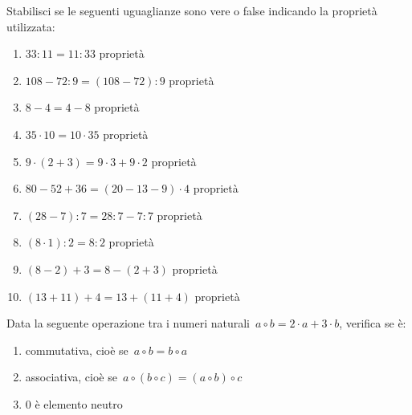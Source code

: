 
\begin{esercizio}
 Stabilisci se le seguenti uguaglianze sono vere o false indicando la 
proprietà utilizzata:
\TabPositions{5cm}
 \begin{enumerate}[noitemsep, label=(\alph*)]
 \item \(33:11=11:33\)	\tab proprietà\dotfill\enspace\boxV\qquad\boxF
 \item \(108-72:9=(108-72):9\)	\tab proprietà\dotfill\enspace\boxV\qquad\boxF
 \item \(8-4=4-8\)	\tab proprietà\dotfill\enspace\boxV\qquad\boxF
 \item \(35\cdot 10=10\cdot 35\)	\tab 
proprietà\dotfill\enspace\boxV\qquad\boxF
 \item \(9\cdot(2+3)=9\cdot3+9\cdot2\)	\tab 
proprietà\dotfill\enspace\boxV\qquad\boxF
 \item \(80-52+36=(20-13-9)\cdot 4\)	\tab 
proprietà\dotfill\enspace\boxV\qquad\boxF
 \item \((28-7):7=28:7-7:7\)	\tab proprietà\dotfill\enspace\boxV\qquad\boxF
 \item \((8\cdot 1):2=8:2\)	\tab proprietà\dotfill\enspace\boxV\qquad\boxF
 \item \((8-2)+3=8-(2+3)\)	\tab proprietà\dotfill\enspace\boxV\qquad\boxF
 \item \((13+11)+4=13+(11+4)\)	\tab proprietà\dotfill\enspace\boxV\qquad\boxF
 \end{enumerate}
\end{esercizio}

\begin{esercizio}
Data la seguente operazione tra i numeri naturali~\(a\circ b=2\cdot a +3\cdot 
b\), verifica se è:
 \begin{enumerate}[noitemsep, label=(\alph*)]
 \item commutativa, cioè se~\(a\circ b=b\circ a\)
 \item associativa, cioè se~\(a\circ (b\circ c)=(a\circ b)\circ c\)
 \item 0 è elemento neutro
 \end{enumerate}
\end{esercizio}

